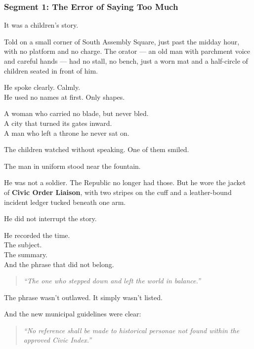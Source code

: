 \documentclass[9pt]{article}
\begin{document}
\newpage

\subsubsection*{Segment 1: The Error of Saying Too Much}

It was a children’s story.

Told on a small corner of South Assembly Square, just past the midday hour, with no platform and no charge. The orator --- an old man with parchment voice and careful hands --- had no stall, no bench, just a worn mat and a half-circle of children seated in front of him.

He spoke clearly. Calmly.\\
He used no names at first. Only shapes.

A woman who carried no blade, but never bled.\\
A city that turned its gates inward.\\
A man who left a throne he never sat on.

The children watched without speaking. One of them smiled.

\vspace{1em}

The man in uniform stood near the fountain.

He was not a soldier. The Republic no longer had those. But he wore the jacket of \textbf{Civic Order Liaison}, with two stripes on the cuff and a leather-bound incident ledger tucked beneath one arm.

He did not interrupt the story.

He recorded the time.\\
The subject.\\
The summary.\\
And the phrase that did not belong.

\begin{quote}
\textit{“The one who stepped down and left the world in balance.”}
\end{quote}

The phrase wasn’t outlawed. It simply wasn’t listed.

And the new municipal guidelines were clear:

\begin{quote}
\textit{“No reference shall be made to historical personae not found within the approved Civic Index.”}
\end{quote}

\vspace{1em}
\end{document}
